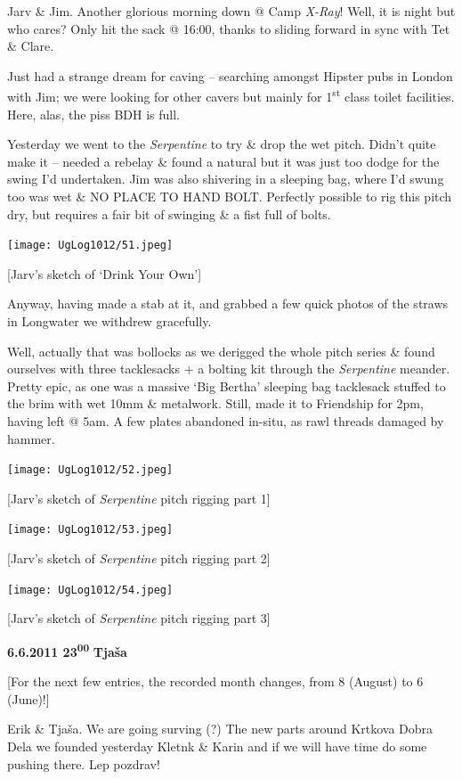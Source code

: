 Jarv \& Jim. Another glorious morning down @ Camp \emph{X-Ray}! Well, it
is night but who cares? Only hit the sack @ 16:00, thanks to sliding
forward in sync with Tet \& Clare.

Just had a strange dream for caving -- searching amongst Hipster pubs in
London with Jim; we were looking for other cavers but mainly for
1\textsuperscript{st} class toilet facilities. Here, alas, the piss BDH
is full.

Yesterday we went to the \emph{Serpentine} to try \& drop the wet pitch.
Didn't quite make it -- needed a rebelay \& found a natural but it was
just too dodge for the swing I'd undertaken. Jim was also shivering in a
sleeping bag, where I'd swung too was wet \& NO PLACE TO HAND BOLT.
Perfectly possible to rig this pitch dry, but requires a fair bit of
swinging \& a fist full of bolts.

\texttt{[image: UgLog1012/51.jpeg]}

{[}Jarv's sketch of `Drink Your Own'{]}

Anyway, having made a stab at it, and grabbed a few quick photos of the
straws in Longwater we withdrew gracefully.

Well, actually that was bollocks as we derigged the whole pitch series
\& found ourselves with three tacklesacks + a bolting kit through the
\emph{Serpentine} meander. Pretty epic, as one was a massive `Big
Bertha' sleeping bag tacklesack stuffed to the brim with wet 10mm \&
metalwork. Still, made it to Friendship for 2pm, having left @ 5am. A
few plates abandoned in-situ, as rawl threads damaged by hammer.

\texttt{[image: UgLog1012/52.jpeg]}

{[}Jarv's sketch of \emph{Serpentine} pitch rigging part 1{]}

\texttt{[image: UgLog1012/53.jpeg]}

{[}Jarv's sketch of \emph{Serpentine} pitch rigging part 2{]}

\texttt{[image: UgLog1012/54.jpeg]}

{[}Jarv's sketch of \emph{Serpentine} pitch rigging part 3{]}

\textbf{6.6.2011 23\textsuperscript{00}} \textbf{Tjaša}

{[}For the next few entries, the recorded month changes, from 8 (August)
to 6 (June)!{]}

Erik \& Tjaša. We are going surving (?) The new parts around Krtkova
Dobra Dela we founded yesterday Kletnk \& Karin and if we will have time
do some pushing there. Lep pozdrav!

